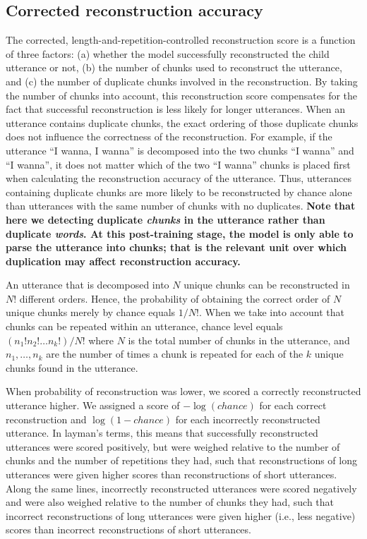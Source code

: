 \documentclass[man,mask,floatsintext]{apa6}
\begin{document}
\subsection{Corrected reconstruction
accuracy}\label{corrected-reconstruction-accuracy}

The corrected, length-and-repetition-controlled reconstruction score is
a function of three factors: (a) whether the model successfully
reconstructed the child utterance or not, (b) the number of chunks used
to reconstruct the utterance, and (c) the number of duplicate chunks
involved in the reconstruction. By taking the number of chunks into
account, this reconstruction score compensates for the fact that
successful reconstruction is less likely for longer utterances. When an
utterance contains duplicate chunks, the exact ordering of those
duplicate chunks does not influence the correctness of the
reconstruction. For example, if the utterance \enquote{I wanna, I wanna}
is decomposed into the two chunks \enquote{I wanna} and \enquote{I
wanna}, it does not matter which of the two \enquote{I wanna} chunks is
placed first when calculating the reconstruction accuracy of the
utterance. Thus, utterances containing duplicate chunks are more likely
to be reconstructed by chance alone than utterances with the same number
of chunks with no duplicates. \textbf{Note that here we detecting
duplicate \emph{chunks} in the utterance rather than duplicate
\emph{words}. At this post-training stage, the model is only able to
parse the utterance into chunks; that is the relevant unit over which
duplication may affect reconstruction accuracy.}

An utterance that is decomposed into \(N\) unique chunks can be
reconstructed in \(N!\) different orders. Hence, the probability of
obtaining the correct order of \(N\) unique chunks merely by chance
equals \(1/N!\). When we take into account that chunks can be repeated
within an utterance, chance level equals \((n_1!n_2!\ldots n_k!)/N!\)
where \(N\) is the total number of chunks in the utterance, and
\(n_1,\ldots,n_k\) are the number of times a chunk is repeated for each
of the \(k\) unique chunks found in the utterance.

When probability of reconstruction was lower, we scored a correctly
reconstructed utterance higher. We assigned a score of \(-\log(chance)\)
for each correct reconstruction and \(\log(1-chance)\) for each
incorrectly reconstructed utterance. In layman's terms, this means that
successfully reconstructed utterances were scored positively, but were
weighed relative to the number of chunks and the number of repetitions
they had, such that reconstructions of long utterances were given higher
scores than reconstructions of short utterances. Along the same lines,
incorrectly reconstructed utterances were scored negatively and were
also weighed relative to the number of chunks they had, such that
incorrect reconstructions of long utterances were given higher (i.e.,
less negative) scores than incorrect reconstructions of short
utterances.
\end{document}
